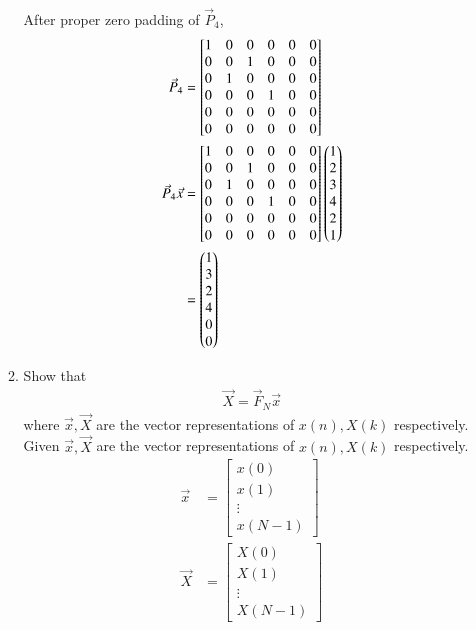 \documentclass[journal,12pt,twocolumn]{IEEEtran}
\renewcommand\thesection{\arabic{section}}
\begin{document}
\begin{enumerate}[label=\thesection.\arabic*]
\begin{enumerate}[label=\arabic*.,ref=\thesection.\theenumi]
\begin{align}
      \end{align}
      After proper zero padding of $\vec{P}_4$,
      \begin{align}
        \vec{P}_4&=\begin{bmatrix}
          1&0&0&0&0&0\\0&0&1&0&0&0\\0&1&0&0&0&0\\0&0&0&1&0&0\\0&0&0&0&0&0\\0&0&0&0&0&0
        \end{bmatrix}\\
        \vec{P}_4 \vec{x}&=\begin{bmatrix}
          1&0&0&0&0&0\\0&0&1&0&0&0\\0&1&0&0&0&0\\0&0&0&1&0&0\\0&0&0&0&0&0\\0&0&0&0&0&0
        \end{bmatrix}\begin{pmatrix}1\\2\\3\\4\\2\\1\end{pmatrix}\\
        &=\begin{pmatrix}1\\3\\2\\4\\0\\0\end{pmatrix}
      \end{align}
     \item Show that 
     \begin{align}
       \label{eq:dft-mat-def}
       \vec{X} = \vec{F}_N \vec{x}
     \end{align}
     where $\vec{x}, \vec{X}$ are the vector representations of $x(n), X(k)$ respectively.\\
     \solution Given $\vec{x}, \vec{X}$ are the vector representations of $x(n), X(k)$ respectively.
     \begin{align}
       \vec{x}&=\begin{bmatrix}
         x(0)\\x(1)\\\vdots\\ x(N-1)
       \end{bmatrix}\\
       \vec{X}&=\begin{bmatrix}
         X(0)\\X(1)\\ \vdots\\ X(N-1)

\end{bmatrix}
\end{align}
\end{enumerate}
\end{enumerate}
\end{document}

